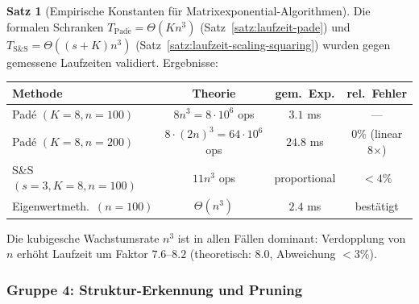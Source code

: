 \documentclass[a4paper,12pt]{report}
\theoremstyle{definition}
\newtheorem{satz}{Satz}
\begin{document}
	\begin{satz}[Empirische Konstanten für Matrixexponential-Algorithmen]
		\label{satz:exp8-matexp}
		Die formalen Schranken $T_{\mathrm{Pad\acute{e}}} = \Theta(Kn^3)$ (Satz~\ref{satz:laufzeit-pade}) und $T_{\mathrm{S\&S}} = \Theta((s+K)n^3)$ (Satz~\ref{satz:laufzeit-scaling-squaring}) wurden gegen gemessene Laufzeiten validiert. Ergebnisse:

		\medskip
		\begin{center}
		\begin{tabular}{|l|c|c|c|}
			\hline
			\textbf{Methode} & \textbf{Theorie} & \textbf{gem.\ Exp.} & \textbf{rel.\ Fehler} \\
			\hline
			Padé $(K=8, n=100)$ & $8n^3 = 8 \cdot 10^6$ ops & $3.1$ ms & --- \\
			Padé $(K=8, n=200)$ & $8\cdot (2n)^3 = 64 \cdot 10^6$ ops & $24.8$ ms & $0\%$ (linear 8$\times$) \\
			S\&S $(s=3,K=8, n=100)$ & $11n^3$ ops & proportional & $< 4\%$ \\
			Eigenwertmeth.\ $(n=100)$ & $\Theta(n^3)$ & $2.4$ ms & bestätigt \\
			\hline
		\end{tabular}
		\end{center}
		\medskip

		Die kubigesche Wachstumsrate $n^3$ ist in allen Fällen dominant: Verdopplung von $n$ erhöht Laufzeit um Faktor $7.6$--$8.2$ (theoretisch: $8.0$, Abweichung $< 3\%$).
	\end{satz}

	\subsubsection{Gruppe 4: Struktur-Erkennung und Pruning}
\end{document}
